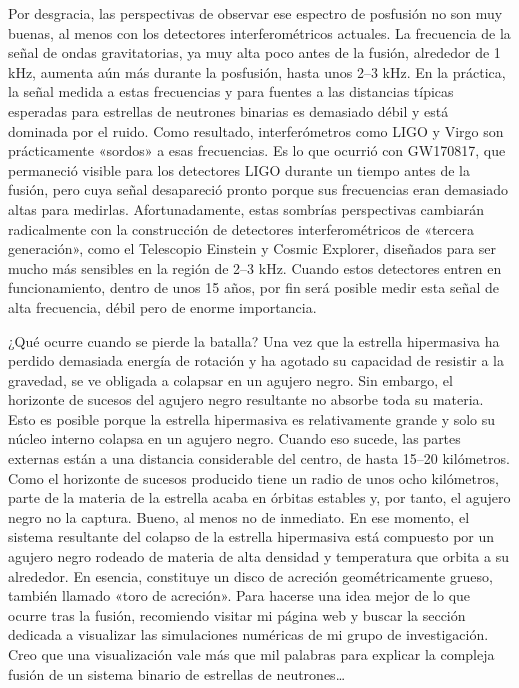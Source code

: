 Por desgracia, las perspectivas de observar ese espectro de posfusión no son muy buenas, al menos con los detectores interferométricos actuales. La frecuencia de la señal de ondas gravitatorias, ya muy alta poco antes de la fusión, alrededor de 1 kHz, aumenta aún más durante la posfusión, hasta unos 2--3 kHz. En la práctica, la señal medida a estas frecuencias y para fuentes a las distancias típicas esperadas para estrellas de neutrones binarias es demasiado débil y está dominada por el ruido. Como resultado, interferómetros como LIGO y Virgo son prácticamente «sordos» a esas frecuencias. Es lo que ocurrió con GW170817, que permaneció visible para los detectores LIGO durante un tiempo antes de la fusión, pero cuya señal desapareció pronto porque sus frecuencias eran demasiado altas para medirlas. Afortunadamente, estas sombrías perspectivas cambiarán radicalmente con la construcción de detectores interferométricos de «tercera generación», como el Telescopio Einstein y Cosmic Explorer, diseñados para ser mucho más sensibles en la región de 2--3 kHz. Cuando estos detectores entren en funcionamiento, dentro de unos 15 años, por fin será posible medir esta señal de alta frecuencia, débil pero de enorme importancia.

¿Qué ocurre cuando se pierde la batalla? Una vez que la estrella hipermasiva ha perdido demasiada energía de rotación y ha agotado su capacidad de resistir a la gravedad, se ve obligada a colapsar en un agujero negro. Sin embargo, el horizonte de sucesos del agujero negro resultante no absorbe toda su materia. Esto es posible porque la estrella hipermasiva es relativamente grande y solo su núcleo interno colapsa en un agujero negro. Cuando eso sucede, las partes externas están a una distancia considerable del centro, de hasta 15--20 kilómetros. Como el horizonte de sucesos producido tiene un radio de unos ocho kilómetros, parte de la materia de la estrella acaba en órbitas estables y, por tanto, el agujero negro no la captura. Bueno, al menos no de inmediato. En ese momento, el sistema resultante del colapso de la estrella hipermasiva está compuesto por un agujero negro rodeado de materia de alta densidad y temperatura que orbita a su alrededor. En esencia, constituye un disco de acreción geométricamente grueso, también llamado «toro de acreción». Para hacerse una idea mejor de lo que ocurre tras la fusión, recomiendo visitar mi página web y buscar la sección dedicada a visualizar las simulaciones numéricas de mi grupo de investigación. Creo que una visualización vale más que mil palabras para explicar la compleja fusión de un sistema binario de estrellas de neutrones\ldots{}

